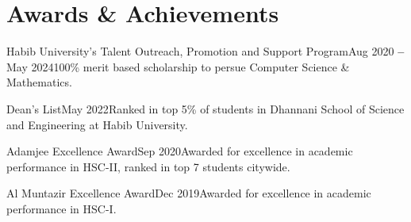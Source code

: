 \section{Awards \& Achievements}
\vspace{2pt}
\resumeSubHeadingListStart

\resumeOrganizationHeading
{Habib University's Talent Outreach, Promotion and Support Program}{Aug 2020 \textbf{--} May 2024}{100\% merit based scholarship to persue Computer Science \& Mathematics.}

\resumeOrganizationHeading
{Dean's List}{May 2022}{Ranked in top 5\% of students in Dhannani School of Science and Engineering at Habib University.}

\resumeOrganizationHeading
{Adamjee Excellence Award}{Sep 2020}{Awarded for excellence in academic performance in HSC-II, ranked in top 7 students citywide.}

\resumeOrganizationHeading
{Al Muntazir Excellence Award}{Dec 2019}{Awarded for excellence in academic performance in HSC-I.}

\resumeSubHeadingListEnd